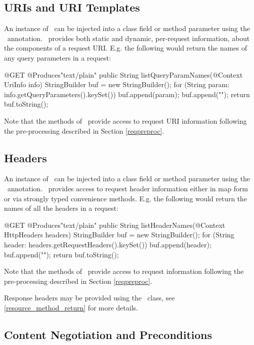 \subsection{URIs and URI Templates}

An instance of \UriInfo\ can be injected into a class field or method parameter using the \Context\ annotation. \UriInfo\ provides both static and dynamic, per-request information, about the components of a request URI. E.g. the following would return the names of any query parameters in a request:

\begin{listing}{1}
@GET
@Produces{"text/plain"}
public String listQueryParamNames(@Context UriInfo info) {
  StringBuilder buf = new StringBuilder();
  for (String param: info.getQueryParameters().keySet()) {
    buf.append(param);
    buf.append("\n");
  }
  return buf.toString();
}
\end{listing}

Note that the methods of \UriInfo\ provide access to request URI information following the pre-processing described in Section \ref{reqpreproc}.

\subsection{Headers}
\label{httpheaders}

An instance of \HttpHeaders\ can be injected into a class field or method parameter using the \Context\ annotation. \HttpHeaders\ provides access to request header information either in map form or via strongly typed convenience methods. E.g. the following would return the names of all the headers in a request:

\begin{listing}{1}
@GET
@Produces{"text/plain"}
public String listHeaderNames(@Context HttpHeaders headers) {
  StringBuilder buf = new StringBuilder();
  for (String header: headers.getRequestHeaders().keySet()) {
    buf.append(header);
    buf.append("\n");
  }
  return buf.toString();
}
\end{listing}

Note that the methods of \HttpHeaders\ provide access to request information following the pre-processing described in Section \ref{reqpreproc}.

Response headers may be provided using the \Response\ class, see \ref{resource_method_return} for more details.

\subsection{Content Negotiation and Preconditions}
\label{conneg_and_preconditions}


